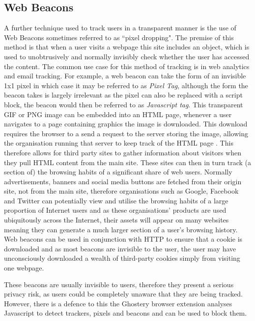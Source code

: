 \documentclass[12pt]{article}
\begin{document}
\subsection{Web Beacons}
A further technique used to track users in a transparent manner is the use of Web Beacons sometimes referred to as ``pixel dropping". The premise of this method is that when a user visits a webpage this site includes an object, which is used to unobtrusively and normally invisibly check whether the user has accessed the content. The common use case for this method of tracking is in web analytics and email tracking. For example, a web beacon can take the form of an invisible 1x1 pixel in which case it may be referred to as \textit{Pixel Tag}, although the form the beacon takes is largely irrelevant as the pixel can also be replaced with a script block, the beacon would then be referred to as \textit{Javascript tag}. This transparent GIF or PNG image can be embedded into an HTML page, whenever a user navigates to a page containing graphics the image is downloaded. This download requires the browser to a send a request to the server storing the image, allowing the organisation running that server to keep track of the HTML page \parencite{webBeacons}. This therefore allows for third party sites to gather information about visitors when they pull HTML content from the main site. These sites can then in turn track (a section of) the browsing habits of a significant share of web users. Normally advertisements, banners and social media buttons are fetched from their origin site, not from the main site, therefore organisations such as Google, Facebook and Twitter can potentially view and utilise the browsing habits of a large proportion of Internet users and as these organisations' products are used ubiquitously across the Internet, their assets will appear on many websites meaning they can generate a much larger section of a user's browsing history.   Web beacons can be used in conjunction with HTTP to ensure that a cookie is downloaded and as most beacons are invisible to the user, the user may have unconsciously downloaded a wealth of third-party cookies simply from visiting one webpage. \newline

These beacons are usually invisible to users, therefore they present a serious privacy risk, as users could be completely unaware that they are being tracked. However, there is a defence to this the Ghostery browser extension analyses Javascript to detect trackers, pixels and beacons and can be used to block them. 
    
\end{document}

